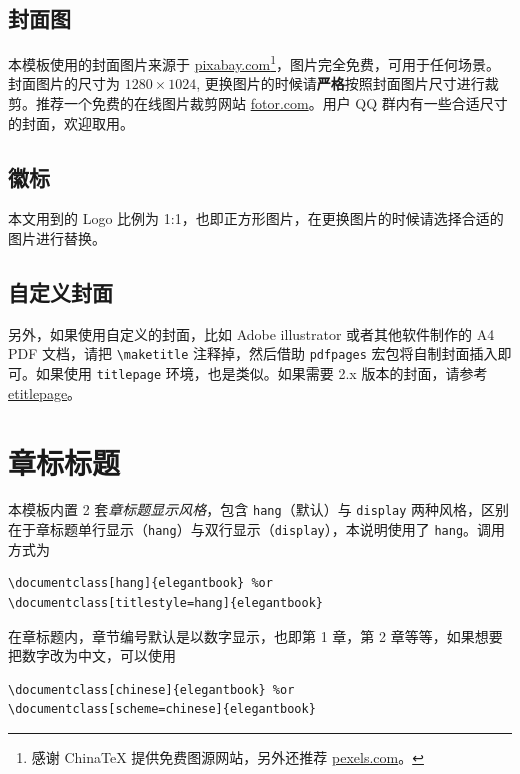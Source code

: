 \documentclass[lang=cn,newtx,10pt,scheme=chinese]{elegantbook}
\begin{document}
\subsection{封面图}

本模板使用的封面图片来源于 \href{https://pixabay.com/en/tea-time-poetry-coffee-reading-3240766/}{pixabay.com}\footnote{感谢 China\TeX{} 提供免费图源网站，另外还推荐 \href{https://www.pexels.com/}{pexels.com}。}，图片完全免费，可用于任何场景。封面图片的尺寸为 $1280 \times 1024$, 更换图片的时候请\textbf{严格}按照封面图片尺寸进行裁剪。推荐一个免费的在线图片裁剪网站 \href{https://www.fotor.com/cn}{fotor.com}。用户 QQ 群内有一些合适尺寸的封面，欢迎取用。

\subsection{徽标}

本文用到的 Logo 比例为 1:1，也即正方形图片，在更换图片的时候请选择合适的图片进行替换。

\subsection{自定义封面}

另外，如果使用自定义的封面，比如 Adobe illustrator 或者其他软件制作的 A4 PDF 文档，请把 \lstinline{\maketitle} 注释掉，然后借助 \lstinline{pdfpages} 宏包将自制封面插入即可。如果使用 \lstinline{titlepage} 环境，也是类似。如果需要 2.x 版本的封面，请参考 \href{https://github.com/EthanDeng/etitlepage}{etitlepage}。

\section{章标标题}

本模板内置 2 套\textit{章标题显示风格}，包含 \lstinline{hang}（默认）与 \lstinline{display} 两种风格，区别在于章标题单行显示（\lstinline{hang}）与双行显示（\lstinline{display}），本说明使用了 \lstinline{hang}。调用方式为
\begin{lstlisting}
\documentclass[hang]{elegantbook} %or
\documentclass[titlestyle=hang]{elegantbook}
\end{lstlisting}

在章标题内，章节编号默认是以数字显示，也即{\kaishu 第 1 章}，{\kaishu 第 2 章}等等，如果想要把数字改为中文，可以使用
\begin{lstlisting}
\documentclass[chinese]{elegantbook} %or
\documentclass[scheme=chinese]{elegantbook}
\end{lstlisting}
\end{document}
